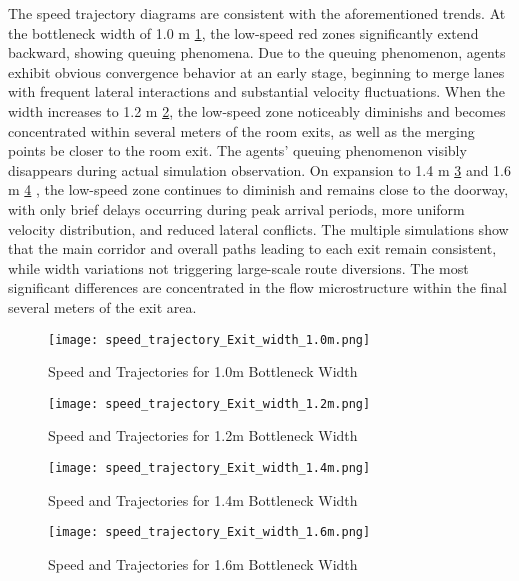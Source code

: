 The speed trajectory diagrams are consistent with the aforementioned trends. At the bottleneck width of 1.0 m \ref{fig:speed_trajectory_layout_1.0m}, the low-speed red zones significantly extend backward, showing queuing phenomena. Due to the queuing phenomenon, agents exhibit obvious convergence behavior at an early stage, beginning to merge lanes with frequent lateral interactions and substantial velocity fluctuations. When the width increases to 1.2 m \ref{fig:speed_trajectory_layout_1.2m}, the low-speed zone noticeably diminishs and becomes concentrated within several meters of the room exits, as well as the merging points be closer to the room exit. The agents' queuing phenomenon visibly disappears during actual simulation observation. On expansion to 1.4 m \ref{fig:speed_trajectory_layout_1.4m} and 1.6 m \ref{fig:speed_trajectory_layout_1.6m} , the low-speed zone continues to diminish and remains close to the doorway, with only brief delays occurring during peak arrival periods, more uniform velocity distribution, and reduced lateral conflicts. The multiple simulations show that the main corridor and overall paths leading to each exit remain consistent, while width variations not triggering large-scale route diversions. The most significant differences are concentrated in the flow microstructure within the final several meters of the exit area.

\begin{figure}[h]
    \centering
    \texttt{[image: speed\_trajectory\_Exit\_width\_1.0m.png]}
    \caption{Speed and Trajectories for 1.0m Bottleneck Width}
    \label{fig:speed_trajectory_layout_1.0m}
\end{figure}

\begin{figure}[h]
    \centering
    \texttt{[image: speed\_trajectory\_Exit\_width\_1.2m.png]}
    \caption{Speed and Trajectories for 1.2m Bottleneck Width}
    \label{fig:speed_trajectory_layout_1.2m}
\end{figure}

\begin{figure}[h]
    \centering
    \texttt{[image: speed\_trajectory\_Exit\_width\_1.4m.png]}
    \caption{Speed and Trajectories for 1.4m Bottleneck Width}
    \label{fig:speed_trajectory_layout_1.4m}
\end{figure}

\begin{figure}[h]
    \centering
    \texttt{[image: speed\_trajectory\_Exit\_width\_1.6m.png]}
    \caption{Speed and Trajectories for 1.6m Bottleneck Width}
    \label{fig:speed_trajectory_layout_1.6m}
\end{figure}


